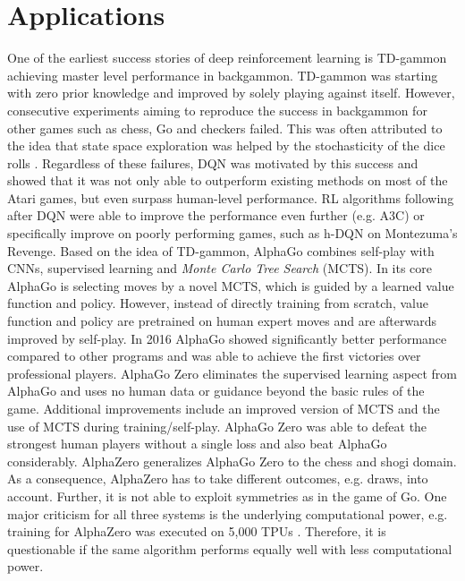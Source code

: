     \section{Applications \label{sec:applications}}
    One of the earliest success stories of deep reinforcement learning is TD-gammon \cite{Tesauro1994} achieving master level performance in backgammon.
    TD-gammon was starting with zero prior knowledge and improved by solely playing against itself.
    However, consecutive experiments aiming to reproduce the success in backgammon for other games such as chess, Go and checkers failed.
    This was often attributed to the idea that state space exploration was helped by the stochasticity of the dice rolls \cite{Pollack1997a}.
    Regardless of these failures, DQN was motivated by this success and showed that it was not only able to outperform existing methods on most of the Atari games, but even surpass human-level performance. 
    RL algorithms following after DQN were able to improve the performance even further (e.g. A3C) or specifically improve on poorly performing games, such as h-DQN on Montezuma's Revenge.
    Based on the idea of TD-gammon, AlphaGo \cite{Silver2016} combines self-play with CNNs, supervised learning and \textit{Monte Carlo Tree Search} (MCTS). 
    In its core AlphaGo is selecting moves by a novel MCTS, which is guided by a learned value function and policy.
    However, instead of directly training from scratch, value function and policy are pretrained on human expert moves and are afterwards improved by self-play.
    In 2016 AlphaGo showed significantly better performance compared to other programs and was able to achieve the first victories over professional players.
    AlphaGo Zero \cite{Silver2017a} eliminates the supervised learning aspect from AlphaGo and uses no human data or guidance beyond the basic rules of the game.
    Additional improvements include an improved version of MCTS and the use of MCTS during training/self-play.
    AlphaGo Zero was able to defeat the strongest human players without a single loss and also beat AlphaGo considerably.
    AlphaZero \cite{Silver2017} generalizes AlphaGo Zero to the chess and shogi domain.
    As a consequence, AlphaZero has to take different outcomes, e.g. draws, into account.
    Further, it is not able to exploit symmetries as in the game of Go.
    One major criticism for all three systems is the underlying computational power, e.g. training for AlphaZero was executed on 5,000 TPUs \cite{Jouppi2017}. 
    Therefore, it is questionable if the same algorithm performs equally well with less computational power.\\
